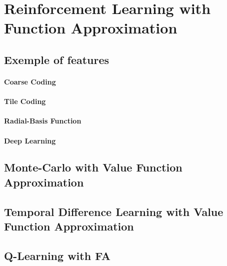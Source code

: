 

\section{Reinforcement Learning with Function Approximation} %
	\label{sec:reinforcement_learning_with_function_approximation}

	\subsection{Exemple of features} %
		\label{sub:exemple_of_features}

		\paragraph*{Coarse Coding}
		\paragraph*{Tile Coding}
		\paragraph*{Radial-Basis Function}
		\paragraph*{Deep Learning}

	\subsection{Monte-Carlo with Value Function Approximation} %
		\label{sub:monte_carlo_with_value_function_approximation}
	
	
	\subsection{Temporal Difference Learning with Value Function Approximation} %
	\label{sub:temporal_difference_learning_with_value_function_approximation}

	
	\subsection{Q-Learning with FA} %
	\label{sub:q_learning_with_fa}
	
